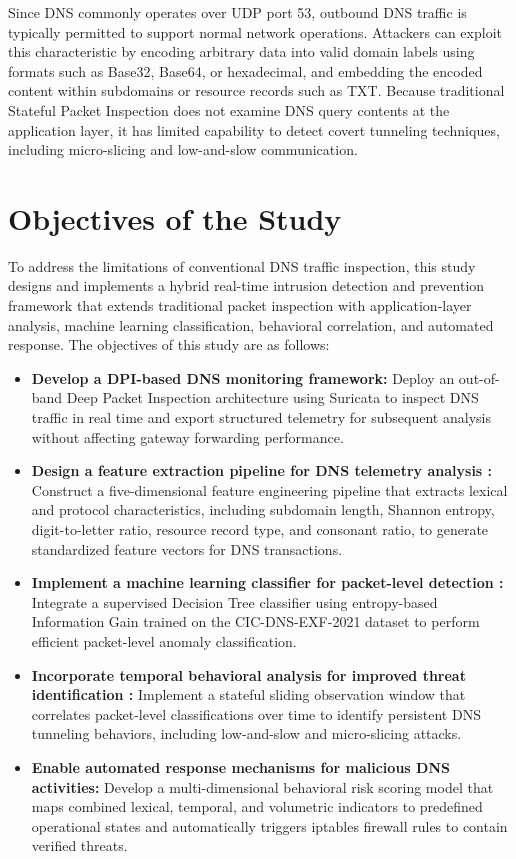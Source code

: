 \documentclass[14pt, a4paper, oneside]{report}
\begin{document}
Since DNS commonly operates over UDP port 53, outbound DNS traffic is typically permitted to support normal network operations. Attackers can exploit this characteristic by encoding arbitrary data into valid domain labels using formats such as Base32, Base64, or hexadecimal, and embedding the encoded content within subdomains or resource records such as TXT. Because traditional Stateful Packet Inspection does not examine DNS query contents at the application layer, it has limited capability to detect covert tunneling techniques, including micro-slicing and low-and-slow communication.

\section{Objectives of the Study}
\label{sec:objectives}
To address the limitations of conventional DNS traffic inspection, this study designs and implements a hybrid real-time intrusion detection and prevention framework that extends traditional packet inspection with application-layer analysis, machine learning classification, behavioral correlation, and automated response. The objectives of this study are as follows:
\begin{itemize}
    \item \textbf{Develop a DPI-based DNS monitoring framework:} Deploy an out-of-band Deep Packet Inspection architecture using Suricata to inspect DNS traffic in real time and export structured telemetry for subsequent analysis without affecting gateway forwarding performance.
    \item \textbf{Design a feature extraction pipeline for DNS telemetry analysis
:} Construct a five-dimensional feature engineering pipeline that extracts lexical and protocol characteristics, including subdomain length, Shannon entropy, digit-to-letter ratio, resource record type, and consonant ratio, to generate standardized feature vectors for DNS transactions.
    \item \textbf{Implement a machine learning classifier for packet-level detection
:} Integrate a supervised Decision Tree classifier using entropy-based Information Gain trained on the CIC-DNS-EXF-2021 dataset to perform efficient packet-level anomaly classification.
    \item \textbf{Incorporate temporal behavioral analysis for improved threat identification
:} Implement a stateful sliding observation window that correlates packet-level classifications over time to identify persistent DNS tunneling behaviors, including low-and-slow and micro-slicing attacks.
    \item \textbf{Enable automated response mechanisms for malicious DNS activities:} Develop a multi-dimensional behavioral risk scoring model that maps combined lexical, temporal, and volumetric indicators to predefined operational states and automatically triggers iptables firewall rules to contain verified threats.
\end{itemize}
\end{document}
